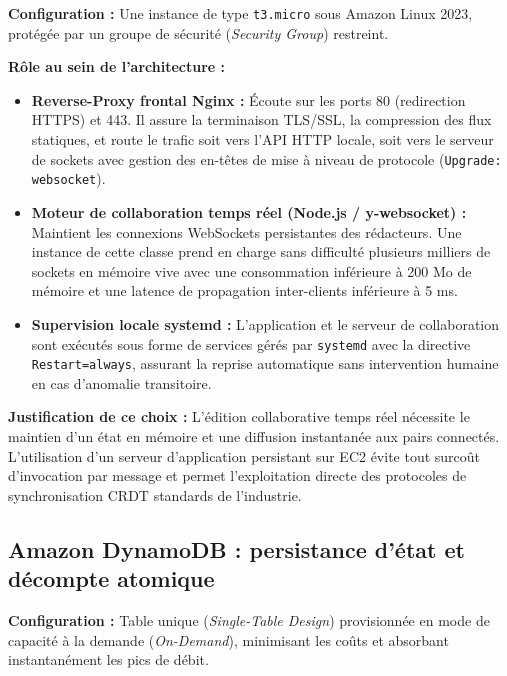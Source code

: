\textbf{Configuration :} Une instance de type \texttt{t3.micro} sous Amazon Linux 2023, protégée par un groupe de sécurité (\emph{Security Group}) restreint.

\textbf{Rôle au sein de l'architecture :}
\begin{itemize}
    \item \textbf{Reverse-Proxy frontal Nginx :} Écoute sur les ports 80 (redirection HTTPS) et 443. Il assure la terminaison TLS/SSL, la compression des flux statiques, et route le trafic soit vers l'API HTTP locale, soit vers le serveur de sockets avec gestion des en-têtes de mise à niveau de protocole (\texttt{Upgrade: websocket}).
    \item \textbf{Moteur de collaboration temps réel (Node.js / y-websocket) :} Maintient les connexions WebSockets persistantes des rédacteurs. Une instance de cette classe prend en charge sans difficulté plusieurs milliers de sockets en mémoire vive avec une consommation inférieure à 200 Mo de mémoire et une latence de propagation inter-clients inférieure à 5 ms.
    \item \textbf{Supervision locale systemd :} L'application et le serveur de collaboration sont exécutés sous forme de services gérés par \texttt{systemd} avec la directive \texttt{Restart=always}, assurant la reprise automatique sans intervention humaine en cas d'anomalie transitoire.
\end{itemize}

\textbf{Justification de ce choix :}
L'édition collaborative temps réel nécessite le maintien d'un état en mémoire et une diffusion instantanée aux pairs connectés. L'utilisation d'un serveur d'application persistant sur EC2 évite tout surcoût d'invocation par message et permet l'exploitation directe des protocoles de synchronisation CRDT standards de l'industrie.

\subsection{Amazon DynamoDB : persistance d'état et décompte atomique}

\textbf{Configuration :} Table unique (\emph{Single-Table Design}) provisionnée en mode de capacité à la demande (\emph{On-Demand}), minimisant les coûts et absorbant instantanément les pics de débit.

